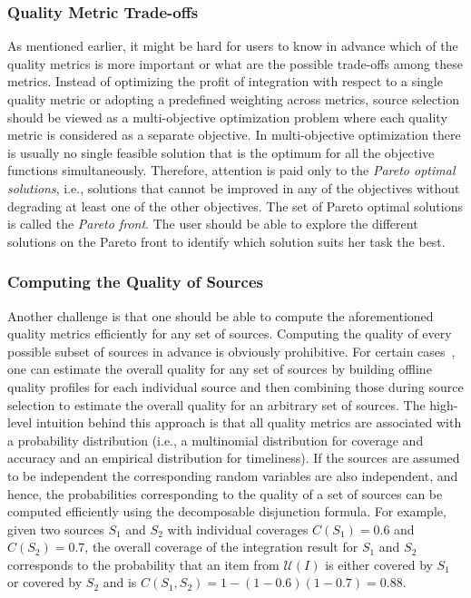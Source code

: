 \documentclass{sig-alternate}
\begin{document}
\subsubsection{Quality Metric Trade-offs}
As mentioned earlier, it might be hard for users to know in advance which of the quality metrics is more important or what are the possible trade-offs among these metrics. Instead of optimizing the profit of integration with respect to a single quality metric or adopting a predefined weighting across metrics, source selection should be viewed as a multi-objective optimization problem where each quality metric is considered as a separate objective. In multi-objective optimization there is usually no single feasible solution that is the optimum for all the objective functions simultaneously. Therefore, attention is paid only to the {\em Pareto optimal solutions}, i.e., solutions that cannot be improved in any of the objectives without degrading at least one of the other objectives. The set of Pareto optimal solutions is called the {\em Pareto front}. The user should be able to explore the different solutions on the Pareto front to identify which solution suits her task the best. 

\subsubsection{Computing the Quality of Sources} 
Another challenge is that one should be able to compute the aforementioned quality metrics efficiently for any set of sources. Computing the quality of every possible subset of sources in advance is obviously prohibitive. For certain cases~\cite{dong:vldb13,rekatsinas:2014}, one can estimate the overall quality for any set of sources by building offline quality profiles for each individual source and then combining those during source selection to estimate the overall quality for an arbitrary set of sources. The high-level intuition behind this approach is that all quality metrics are associated with a probability distribution (i.e., a multinomial distribution for coverage and accuracy and an empirical distribution for timeliness). If the sources are assumed to be independent the corresponding random variables are also independent, and hence, the probabilities corresponding to the quality of a set of sources can be computed efficiently using the decomposable disjunction formula. For example, given two sources $S_1$ and $S_2$ with individual coverages $C(S_1) = 0.6$ and $C(S_2) = 0.7$, the overall coverage of the integration result for $S_1$ and $S_2$ corresponds to the probability that an item from $\mathcal{U}(I)$ is either covered by $S_1$ or covered by $S_2$ and is $C(S_1,S_2) = 1 - (1-0.6)(1-0.7) = 0.88$.
\end{document}
